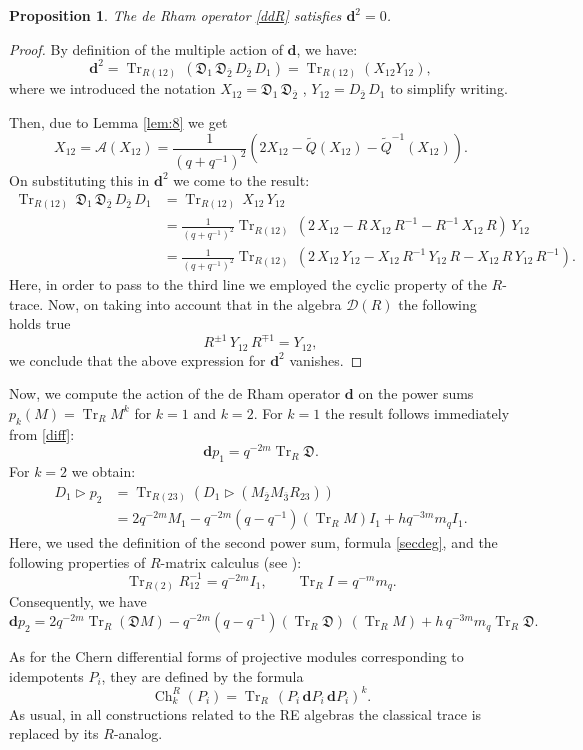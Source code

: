 \documentclass[11pt]{article}
\newcommand{\qq}{q^{-1}}
\DeclareMathOperator{\Tr}{Tr}
\newcommand{\ov}{\overline}
\newcommand{\DD}{\mathcal{D}}
\newcommand{\DDDD}{\mathfrak{D}}
\newcommand{\AAA}{\mathcal{A}}
\newcommand{\tQ}{\widetilde Q}
\newcommand{\dd}{\mathbf{d}}
\numberwithin{equation}{section}
\theoremstyle{plain}
\newtheorem{proposition}[theorem]{Proposition}
\theoremstyle{definition}
\begin{document}
\begin{proposition}
The de Rham operator \eqref{ddR} satisfies $\dd^2=0$.
\end{proposition}

\begin{proof}
By definition of the multiple action of $\dd$, we have:
\[
\dd^2= \Tr_{R(12)}\, (\DDDD_1\, \DDDD_{\ov 2}\, D_{\ov 2}\, D_1) = \Tr_{R(12)}(X_{12}Y_{12}),
\]
where we introduced the notation $X_{12}=\DDDD_1\, \DDDD_{\ov 2}$ , $Y_{12}=D_{\ov 2}\, D_1$
to simplify writing.

Then, due to Lemma \ref{lem:8} we get
\[X_{12} =  {\AAA}(X_{12})=\frac{1}{(q+\qq)^2}\left(2 X_{12}-\tQ(X_{12})-\tQ^{-1}(X_{12})\right).
\]
On substituting this in $\dd^2$ we come to the result:
\begin{align*}
	\Tr_{R(12)}\, \DDDD_1\, \DDDD_{\ov 2}\, D_{\ov 2}\, D_1
	&=\Tr_{R(12)}\,X_{12}\, Y_{12} \\
	&=\frac{1}{(q+\qq)^2}
	\Tr_{R(12)}\,(2\,X_{12}-R\, X_{12}\, R^{-1}-R^{-1}\,X_{12}\, R)\, Y_{12} \\
	&=\frac{1}{(q+\qq)^2}
	\Tr_{R(12)}\,(2\,X_{12}\, Y_{12}- X_{12}\, R^{-1}\, Y_{12}\, R
	-X_{12}\, R\, Y_{12}\, R^{-1}).
\end{align*}
Here, in order to pass to the third line we employed the cyclic property of the $R$-trace. Now, on taking into account that in the
algebra $\DD(R)$ the following holds true
\[
R^{\pm 1}\, Y_{12}\, R^{\mp 1}= Y_{12},
\]
we conclude that the above expression for $\dd^2$ vanishes.
\end{proof}

Now, we compute the action of the de Rham operator $\dd$ on the power sums $p_k(M)=\Tr_R M^k$ for $k=1$ and $k=2$.
For $k=1$ the result follows immediately from \eqref{diff}:
\[
\dd p_1 =q^{-2m}\Tr_R\DDDD.
\]
For $k=2$ we obtain:
\begin{align*}
D_1\triangleright p_2
&= \Tr_{R(23)}\!\left(D_1\triangleright
   (M_{\ov 2}M_{\ov 3}R_{23})\right)\\
&=2q^{-2m}M_1-q^{-2m}(q-\qq)(\Tr_R M)I_1
  +h q^{-3m}m_q I_1.
\end{align*}
Here, we used the definition of the second power sum, formula \eqref{secdeg}, and the following properties  of $R$-matrix calculus
(see \cite{GPS1}):
\[
\Tr_{R(2)} R_{12}^{-1} = q^{-2m} I_1,\qquad  \Tr_R I=q^{-m} m_q.
\]
Consequently, we have
\[\dd p_2 =2q^{-2m}\Tr_{R} (\DDDD M)-q^{-2m} (q-\qq) (\Tr_R \DDDD)\, (\Tr_R M)+h\, q^{-3m} m_q \Tr_{R} \DDDD.
\]

As for the Chern differential forms of projective modules corresponding to idempotents $P_i$, they are defined by the formula
\begin{equation}
\operatorname{Ch}^R_k(P_i)=\Tr_R\,(P_i\,\dd P_i\,\dd P_i)^k.
\label{Chern}
\end{equation}
As usual, in all constructions related to the RE algebras the classical trace is replaced by its $R$-analog.
\end{document}
